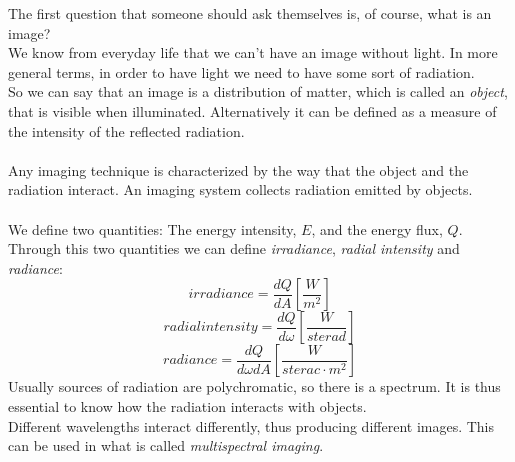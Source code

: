 The first question that someone should ask themselves is, of course, what is an image? \\
We know from everyday life that we can't have an image without light. In more general terms, in order to have light we need to have some sort of radiation. \\ 
So we can say that an image is a distribution of matter, which is called an \textit{object}, that is visible when illuminated. Alternatively it can be defined as a measure of the intensity of the reflected radiation. \\ \\
Any imaging technique is characterized by the way that the object and the radiation interact. An imaging system collects radiation emitted by objects. \\ \\
We define two quantities: The energy intensity, $E$, and the energy flux, $Q$. \\
Through this two quantities we can define \textit{irradiance}, \textit{radial intensity} and \textit{radiance}:
$$
	irradiance = \frac{dQ}{dA} \left[\frac{W}{m^2}\right] 
$$
$$
	radial intensity = \frac{dQ}{d\omega} \left[\frac{W}{sterad}\right]
$$
$$
	radiance = \frac{dQ}{d\omega dA} \left[\frac{W}{sterac\cdot m^2}\right]
$$
Usually sources of radiation are polychromatic, so there is a spectrum. It is thus essential to know how the radiation interacts with objects.  \\
Different wavelengths interact differently, thus producing different images. This can be used in what is called \textit{multispectral imaging}. 
